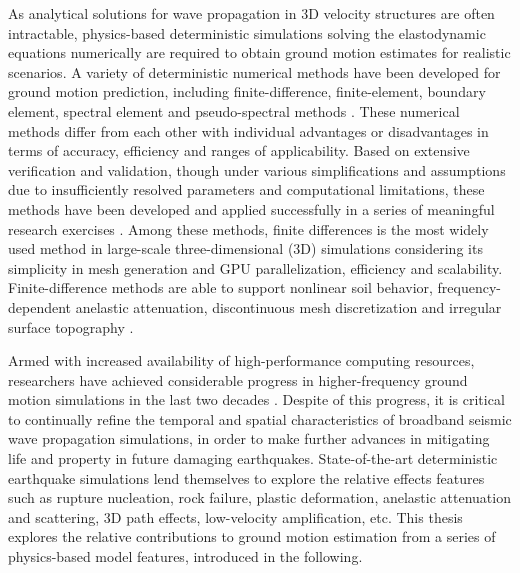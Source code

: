 As analytical solutions for wave propagation in 3D velocity structures are often intractable, physics-based deterministic simulations solving the elastodynamic equations numerically are required to obtain ground motion estimates for realistic scenarios. A variety of deterministic numerical methods have been developed for ground motion prediction, including finite-difference, finite-element, boundary element, spectral element and pseudo-spectral methods . These numerical methods differ from each other with individual advantages or disadvantages in terms of accuracy, efficiency and ranges of applicability.  Based on extensive verification and validation, though under various simplifications and assumptions due to insufficiently resolved parameters and computational limitations, these methods have been developed and applied successfully in a series of meaningful research exercises \citep[e.g., ShakeOut, PetaShake, M9 Cascadia; for more details readers are referred to ][]{cuiPetascaleEarthquakeSimulations2009,cuiTeraShakeComputationalPlatform2009,olsen2009shakeout,marafiImpactsSimulatedM92019}. Among these methods, finite differences is the most widely used method in large-scale three-dimensional (3D) simulations considering its simplicity in mesh generation and GPU parallelization, efficiency and scalability. Finite-difference methods are able to support nonlinear soil behavior, frequency-dependent anelastic attenuation, discontinuous mesh discretization and irregular surface topography .

Armed with increased availability of high-performance computing resources, researchers have achieved considerable progress in higher-frequency ground motion simulations in the last two decades \citep{gravesBroadbandSimulationsSouthern2008,olsen2009shakeout,bielakShakeOutEarthquakeScenario2010,roten3DSimulationsEarthquakes2012, savranGroundMotionSimulation2019,withersGroundMotionIntraevent2019}. Despite of this progress, it is critical to continually refine the temporal and spatial characteristics of broadband seismic wave propagation simulations, in order to make further advances in mitigating life and property in future damaging earthquakes. State-of-the-art deterministic earthquake simulations lend themselves to explore the relative effects features such as rupture nucleation, rock failure, plastic deformation, anelastic attenuation and scattering, 3D path effects, low-velocity amplification, etc. This thesis explores the relative contributions to ground motion estimation from a series of physics-based model features, introduced in the following.


